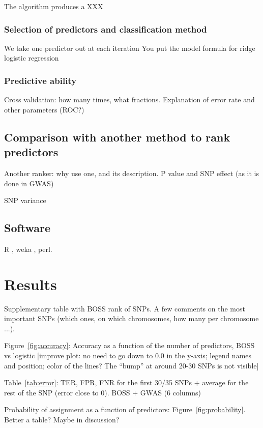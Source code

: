 The algorithm produces a XXX

\subsubsection{Selection of predictors and classification method}
\label{par:predictor_selection}
We take one predictor out at each iteration
You put the model formula for ridge logistic regression

\subsubsection{Predictive ability}
\label{par:estimating_error}
Cross validation: how many times, what fractions. 
Explanation of error rate and other parameters (ROC?)

\subsection{Comparison with another method to rank predictors}
\label{sec:other_ranker}
Another ranker: why use one, and its description.
P value and SNP effect (as it is done in GWAS)

SNP variance \cite{gianola2009additive}

\subsection{Software}
\label{sec:software}
R \cite{r2008manual}, weka \cite{hall2009weka}, perl.

\section{Results}
\label{sec:results}
Supplementary table with BOSS rank of SNPs. A few comments on the most
important SNPs (which ones, on which chromosomes, how many per
chromosome ...).

Figure~\ref{fig:accuracy}: Accuracy as a function of the number of
predictors, BOSS vs logistic [improve plot: no need to go down to 0.0 in
the y-axis; legend names and position; color of the lines? The ``bump''
at around 20-30 SNPs is not visible]

Table~\ref{tab:error}: TER, FPR, FNR for the first 30/35 SNPs + average for the
rest of the SNP (error close to $0$). BOSS + GWAS (6 columns)


Probability of assignment as a function of predictors:
Figure~\ref{fig:probability}. Better a table? Maybe in discussion?

